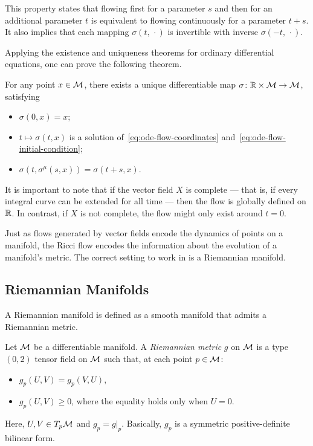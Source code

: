 This property states that flowing first for a parameter $s$ and then for an additional parameter $t$ is equivalent to flowing continuously for a parameter $t + s$. It also implies that each mapping $\sigma(t,\,\cdot)$ is invertible with inverse $\sigma(-t,\,\cdot)$.

Applying the existence and uniqueness theorems for ordinary differential equations, one can prove the following theorem.

\begin{theorem}
	For any point $x \in \mathcal{M}$, there exists a unique differentiable map $\sigma \colon \mathbb{R} \times \mathcal{M} \to \mathcal{M}$, satisfying
	\begin{itemize}
		\item $\sigma(0,x) = x$;
		\item $t \mapsto \sigma(t,x)$ is a solution of~\eqref{eq:ode-flow-coordinates} and~\eqref{eq:ode-flow-initial-condition};
		\item $\sigma(t,\sigma^\mu(s,x)) = \sigma(t+s,x)$.
	\end{itemize}
\end{theorem}

It is important to note that if the vector field $X$ is complete — that is, if every integral curve can be extended for all time — then the flow is globally defined on $\mathbb{R}$. In contrast, if $X$ is not complete, the flow might only exist around $t = 0$.

Just as flows generated by vector fields encode the dynamics of points on a manifold, the Ricci flow encodes the information about the evolution of a manifold's metric. The correct setting to work in is a Riemannian manifold. 


\subsection{Riemannian Manifolds}
A Riemannian manifold is defined as a smooth manifold that admits a Riemannian metric.

\begin{definition}
	Let $\mathcal{M}$ be a differentiable manifold. A \emph{Riemannian metric} $g$ on $\mathcal{M}$ is a type $(0,2)$ tensor field on $\mathcal{M}$ such that, at each point $p \in \mathcal{M}$:
	\begin{itemize}
		\item $g_p (U,V) = g_p (V,U)$,
		\item $g_p(U,V) \geq 0$, where the equality holds only when $U=0$.
	\end{itemize}
	Here, $U,V \in T_p \mathcal{M}$ and $g_p = g|_p$. Basically, $g_p$ is a symmetric positive-definite bilinear form.
\end{definition}

